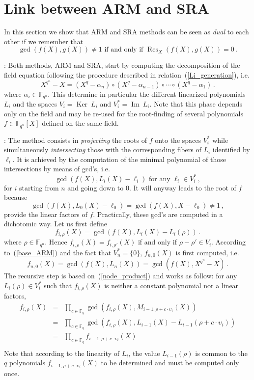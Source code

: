\documentclass{sig-alternate}
\newcommand{\ff}[1]{\mathbb{F}_{#1}}
\newcommand{\qq}{q}
\newcommand{\nn}{n}
\newcommand{\qn}{{\qq^\nn}}
\newcommand{\basef}{\ff{\qq}}
\newcommand{\extf}{\ff{\qn}}
\DeclareMathOperator{\Ker}{Ker}
\DeclareMathOperator{\Ima}{Im}
\DeclareMathOperator{\Res}{Res}
\begin{document}
\section{Link between ARM and SRA}

In this section we show that ARM and SRA methods can be seen as
\emph{dual} to each other if we remember that
$$\gcd(f(X),g(X)) \ne 1 \mbox{  if and only if }\Res_X(f(X),g(X))=0\,.$$

\medskip

: Both methods, ARM and SRA, start by computing the decomposition of the field equation following the procedure described in relation~(\ref{Li_generation}), i.e.
 $$X^{\qn}-X=(X^\qq - \alpha_\nn) \circ (X^\qq - \alpha_{\nn-1}) \circ \cdots \circ (X^\qq - \alpha_1) \,.$$
where $\alpha_i \in \extf$. This determine in particular the different linearized polynomials $L_i$ and the spaces $V_i=\Ker~L_i$ and $V_i^\ast=\Ima~L_i$. Note that this phase depends only on the field and may be re-used for the root-finding of several polynomials $f \in \extf[X]$ defined on the same field.

\medskip

: The method consists in \emph{projecting} the roots of $f$ onto the spaces $V_i^\ast$ while simultaneously \emph{intersecting} those with the corresponding fibers of $L_i$ identified by $\ell_i$.
 It is achieved by the computation of the minimal polynomial of those intersections by means of gcd's, i.e. 
 \begin{equation}
 \label{base_ARM}
\gcd(f(X),L_i(X)-\ell_i)     \mbox{ for any }  \ell_i  \in V_i^\ast\,,
\end{equation}
for $i$ starting from $n$ and going down to 0.
It will anyway leads to the root of $f$ because 
$$\gcd(f(X),L_0(X)-\ell_0)=\gcd(f(X),X-\ell_0) \ne 1\,,$$ 
provide the linear factors of $f$. Practically, these gcd's are computed in a dichotomic way. Let us first define
 $$f_{i,\rho}(X)=\gcd(f(X),L_i(X)-L_i(\rho))\,.$$
where $\rho \in \extf$. Hence $f_{i,\rho}(X)=f_{i,\rho'}(X)$ if and only if $\rho-\rho' \in V_i$.
According to~(\ref{base_ARM}) and the fact that $V_n^\ast=\{0\}$, $f_{n,0}(X)$ is first computed, i.e.
 $$f_{n,0}(X)=\gcd(f(X),L_n(X))=\gcd(f(X),X^{q^\nn}-X)\,.$$
The recursive step is based on~(\ref{node_product}) and works as follow: for any $L_i(\rho) \in V_i^\ast$ such that $f_{i,\rho}(X)$ is neither a constant polynomial nor a linear factors,
  $$
  \begin{array}{lll}
  f_{i,\rho}(X)&=&\prod_{c \in \basef} \gcd(f_{i,\rho}(X),M_{i-1,\rho+c \cdot \upsilon_i}(X)) \\
               &=&\prod_{c \in \basef} \gcd(f_{i,\rho}(X),L_{i-1}(X)-L_{i-1}(\rho+c \cdot \upsilon_i)) \\
               &=&\prod_{c \in \basef} f_{i-1,\rho+c \cdot  \upsilon_i}(X)\\
  \end{array}              
  $$ 
 Note that according to the linearity of $L_i$, the value $L_{i-1}(\rho)$ is common to the $\qq$ polynomials $f_{i-1,\rho+c \cdot  \upsilon_i}(X)$ to be determined and must be computed only once. 
 
\end{document}
